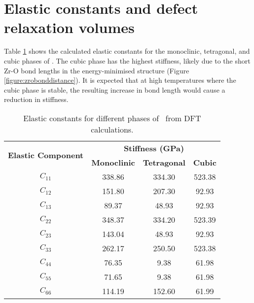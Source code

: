 \section{Elastic constants and defect relaxation volumes}

Table \ref{stiffness_tensor} shows the calculated elastic constants for the monoclinic, tetragonal, and cubic phases of \zirconia . The cubic phase has the highest stiffness, likely due to the short Zr-O bond lengths in the energy-minimised structure (Figure \ref{figure:zrobonddistance}). It is expected that at high temperatures where the cubic phase is stable, the resulting increase in bond length would cause a reduction in stiffness. 

\begin{table}[ht] %
\onehalfspacing
\centering
\caption{Elastic constants for different phases of \zirconia\ from DFT calculations.}
\label{stiffness_tensor}
\begin{tabular}{cccc}
\hline
\multirow{2}{*}{\textbf{Elastic Component}} & \multicolumn{3}{c}{\textbf{Stiffness (GPa)}}               \\ \cline{2-4} 
                                            & \textbf{Monoclinic} & \textbf{Tetragonal} & \textbf{Cubic} \\ \hline
$C_{11}$                                         & 338.86        & 334.30               & 523.38    \\
$C_{12}$                                         & 151.80        & 207.30               & 92.93     \\
$C_{13}$                                         & 89.37         & 48.93               & 92.93     \\
$C_{22}$                                         & 348.37        & 334.20               & 523.39    \\
$C_{23}$                                         & 143.04        & 48.93               & 92.93    \\
$C_{33}$                                         & 262.17        & 250.50               & 523.38   \\
$C_{44}$                                         & 76.35         & 9.38                & 61.98    \\
$C_{55}$                                         & 71.65         & 9.38                & 61.98   \\
$C_{66}$                                         & 114.19        & 152.60               & 61.99     \\ \hline
\end{tabular}
\end{table}


